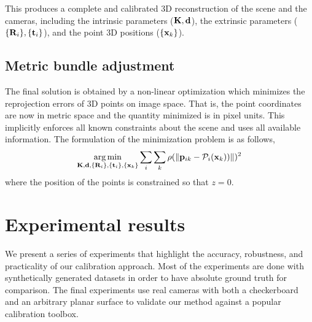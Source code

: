 \documentclass[10pt,twocolumn,letterpaper]{article}
\begin{document}
This produces a complete and calibrated 3D reconstruction of the scene and the cameras, including the intrinsic parameters ($\mathbf{K},\mathbf{d}$), the extrinsic parameters ($\lbrace \mathbf{R}_i \rbrace,\lbrace \mathbf{t}_i \rbrace$), and the point 3D positions ($\lbrace \mathbf{x}_k \rbrace$).

\subsection{Metric bundle adjustment}

The final solution is obtained by a non-linear optimization which minimizes the reprojection errors of 3D points on image space. That is, the point coordinates are now in metric space and the quantity minimized is in pixel units. This implicitly enforces all known constraints about the scene and uses all available information. The formulation of the minimization problem is as follows, 
%
\begin{align}
\argmin_{\Km,\dv,\lbrace \Rm_i \rbrace,\lbrace \tv_i \rbrace, \lbrace \xv_k \rbrace} 
%
\sum_i \sum_k \rho(\norm{\pv_{ik} - \Projection_i(\xv_k))})^2 
\end{align}
%
where the position of the points is constrained so that $z=0$. 

\section{Experimental results}
\label{sec:results}

We present a series of experiments that highlight the accuracy, robustness, and practicality of our calibration approach. Most of the experiments are done with synthetically generated datasets in order to have absolute ground truth for comparison. The final experiments use real cameras with both a checkerboard and an arbitrary planar surface to validate our method against a popular calibration toolbox.
\end{document}
